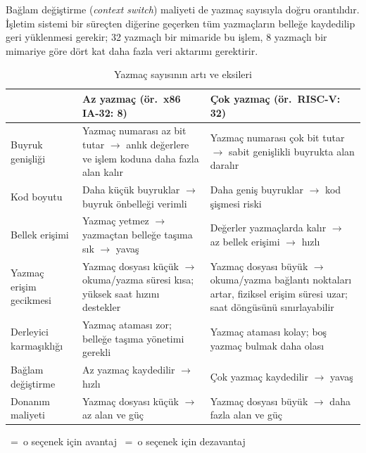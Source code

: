 Bağlam değiştirme (\emph{context switch}) maliyeti de yazmaç sayısıyla doğru orantılıdır. İşletim sistemi bir süreçten diğerine geçerken tüm yazmaçların belleğe kaydedilip geri yüklenmesi gerekir; 32 yazmaçlı bir mimaride bu işlem, 8 yazmaçlı bir mimariye göre dört kat daha fazla veri aktarımı gerektirir.

\newcommand{\artii}{\textcolor{green!60!black}{\ding{51}}\;}
\newcommand{\eksii}{\textcolor{red!70!black}{\ding{55}}\;}

\begin{table}[H]
\centering
\caption{Yazmaç sayısının artı ve eksileri}
\label{tab:yazmac-sayisi-dengeleri}
\small
\begin{tabular}{p{3.2cm}p{5.3cm}p{5.3cm}}
\toprule
 & \textbf{Az yazmaç} (ör.\ x86 IA-32: 8) & \textbf{Çok yazmaç} (ör.\ RISC-V: 32) \\
\midrule
Buyruk genişliği & \artii Yazmaç numarası az bit tutar $\rightarrow$ anlık değerlere ve işlem koduna daha fazla alan kalır & \eksii Yazmaç numarası çok bit tutar $\rightarrow$ sabit genişlikli buyrukta alan daralır \\[4pt]
Kod boyutu & \artii Daha küçük buyruklar $\rightarrow$ buyruk önbelleği verimli & \eksii Daha geniş buyruklar $\rightarrow$ kod şişmesi riski \\[4pt]
Bellek erişimi & \eksii Yazmaç yetmez $\rightarrow$ yazmaçtan belleğe taşıma sık $\rightarrow$ yavaş & \artii Değerler yazmaçlarda kalır $\rightarrow$ az bellek erişimi $\rightarrow$ hızlı \\[4pt]
Yazmaç erişim gecikmesi & \artii Yazmaç dosyası küçük $\rightarrow$ okuma/yazma süresi kısa; yüksek saat hızını destekler & \eksii Yazmaç dosyası büyük $\rightarrow$ okuma/yazma bağlantı noktaları artar, fiziksel erişim süresi uzar; saat döngüsünü sınırlayabilir \\[4pt]
Derleyici karmaşıklığı & \eksii Yazmaç ataması zor; belleğe taşıma yönetimi gerekli & \artii Yazmaç ataması kolay; boş yazmaç bulmak daha olası \\[4pt]
Bağlam değiştirme & \artii Az yazmaç kaydedilir $\rightarrow$ hızlı & \eksii Çok yazmaç kaydedilir $\rightarrow$ yavaş \\[4pt]
Donanım maliyeti & \artii Yazmaç dosyası küçük $\rightarrow$ az alan ve güç & \eksii Yazmaç dosyası büyük $\rightarrow$ daha fazla alan ve güç \\
\bottomrule
\end{tabular}

\medskip
\footnotesize
\textcolor{green!60!black}{}~=~o seçenek için avantaj \quad
\textcolor{red!70!black}{}~=~o seçenek için dezavantaj
\end{table}

